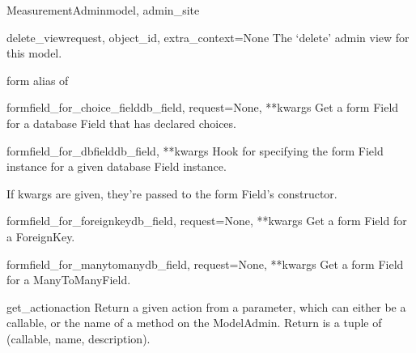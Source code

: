 \documentclass[letterpaper,10pt,english]{sphinxmanual}
\begin{document}
\begin{classdesc}{MeasurementAdmin}{model, admin\_site}
\hypertarget{data.admin.MeasurementAdmin.delete_view}{}\begin{methoddesc}{delete\_view}{request, object\_id, extra\_context=None}
The `delete' admin view for this model.
\end{methoddesc}

\hypertarget{data.admin.MeasurementAdmin.form}{}\begin{memberdesc}{form}
alias of 
\end{memberdesc}

\hypertarget{data.admin.MeasurementAdmin.formfield_for_choice_field}{}\begin{methoddesc}{formfield\_for\_choice\_field}{db\_field, request=None, **kwargs}
Get a form Field for a database Field that has declared choices.
\end{methoddesc}

\hypertarget{data.admin.MeasurementAdmin.formfield_for_dbfield}{}\begin{methoddesc}{formfield\_for\_dbfield}{db\_field, **kwargs}
Hook for specifying the form Field instance for a given database Field
instance.

If kwargs are given, they're passed to the form Field's constructor.
\end{methoddesc}

\hypertarget{data.admin.MeasurementAdmin.formfield_for_foreignkey}{}\begin{methoddesc}{formfield\_for\_foreignkey}{db\_field, request=None, **kwargs}
Get a form Field for a ForeignKey.
\end{methoddesc}

\hypertarget{data.admin.MeasurementAdmin.formfield_for_manytomany}{}\begin{methoddesc}{formfield\_for\_manytomany}{db\_field, request=None, **kwargs}
Get a form Field for a ManyToManyField.
\end{methoddesc}

\hypertarget{data.admin.MeasurementAdmin.get_action}{}\begin{methoddesc}{get\_action}{action}
Return a given action from a parameter, which can either be a callable,
or the name of a method on the ModelAdmin.  Return is a tuple of
(callable, name, description).
\end{methoddesc}


\end{classdesc}
\end{document}
